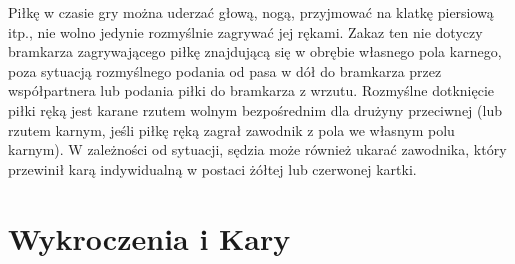 \documentclass[14pt,oneside,a4paper]{book}
\theoremstyle{break}
\begin{document}
Piłkę w czasie gry można uderzać głową, nogą, przyjmować na klatkę piersiową itp., nie wolno jedynie rozmyślnie zagrywać jej rękami. Zakaz ten nie dotyczy bramkarza zagrywającego piłkę znajdującą się w obrębie własnego pola karnego, poza sytuacją rozmyślnego podania od pasa w dół do bramkarza przez współpartnera lub podania piłki do bramkarza z wrzutu. Rozmyślne dotknięcie piłki ręką jest karane rzutem wolnym bezpośrednim dla drużyny przeciwnej (lub rzutem karnym, jeśli piłkę ręką zagrał zawodnik z pola we własnym polu karnym). W zależności od sytuacji, sędzia może również ukarać zawodnika, który przewinił karą indywidualną w postaci żółtej lub czerwonej kartki.

\section {Wykroczenia i Kary}
\end{document}
